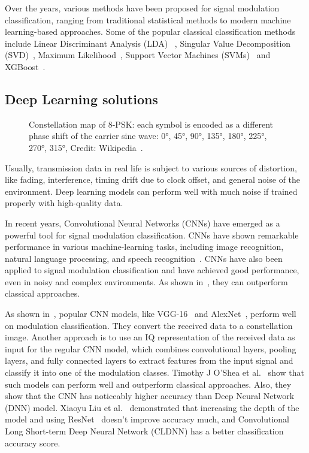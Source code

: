 Over the years, various methods have been proposed for signal modulation classification, ranging from traditional statistical methods to modern machine learning-based approaches. Some of the popular classical classification methods include Linear Discriminant Analysis (LDA)~\cite{LDA_for_simc}
, Singular Value Decomposition (SVD)~\cite{svd_af_for_simc},  Maximum Likelihood~\cite{ML_for_simc}, Support Vector Machines (SVMs)~\cite{SVM_for_simc} and XGBoost~\cite{radioml_2018}. 

\subsection{Deep Learning solutions}


\begin{figure}
\centering
\caption{Constellation map of 8-PSK: each symbol is encoded as a different phase shift of the carrier sine wave: 0°, 45°, 90°, 135°, 180°, 225°, 270°, 315°, Credit: Wikipedia~\cite{constelation_img}. }

\label{fig:8-psk-constellation}
\end{figure}

Usually, transmission data in real life is subject to various sources of distortion, like fading, interference, timing drift due to clock offset, and general noise of the environment. Deep learning models can perform well with much noise if trained properly with high-quality data. %

In recent years, Convolutional Neural Networks (CNNs) have emerged as a powerful tool for signal modulation classification. CNNs have shown remarkable performance in various machine-learning tasks, including image recognition, natural language processing, and speech recognition~\cite{cnn_overview}. CNNs have also been applied to signal modulation classification and have achieved good performance, even in noisy and complex environments. As shown in~\cite{radioml_2018,vgg_simc}, they can outperform classical approaches.

As shown in~\cite{vgg_simc}, popular CNN models, like VGG-16~\cite{vgg16} and AlexNet~\cite{alexnet}, perform well on modulation classification. They convert the received data to a constellation image. Another approach is to use an IQ representation of the received data as input for the regular CNN model, which combines convolutional layers, pooling layers, and fully connected layers to extract features from the input signal and classify it into one of the modulation classes. Timothy J O'Shea et al.~\cite{cnn_dnn_simc} show that such models can perform well and outperform classical approaches. Also, they show that the CNN has noticeably higher accuracy than Deep Neural Network (DNN) model. Xiaoyu Liu et al.~\cite{cnn_resnet_cldnn} demonstrated that increasing the depth of the model and using ResNet~\cite{resnet} doesn't improve accuracy much, and Convolutional Long Short-term Deep Neural Network (CLDNN) has a better classification accuracy score. 

